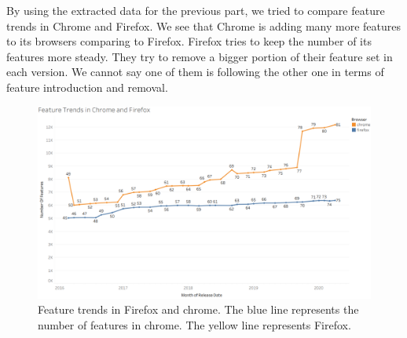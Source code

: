 By using the extracted data for the previous part, we tried to compare feature trends in Chrome and Firefox. We see that Chrome is adding many more features to its browsers comparing to Firefox. Firefox tries to keep the number of its features more steady. They try to remove a bigger portion of their feature set in each version. We cannot say one of them is following the other one in terms of feature introduction and removal.

\begin{figure}[ht]
    \centering
    \includegraphics[width=\columnwidth]{figures/Feature-Trends.PNG}
    \caption{Feature trends in Firefox and chrome. The blue line represents the number of features in chrome. The yellow line represents Firefox.}
    \label{fig:times_bar}
\end{figure}

